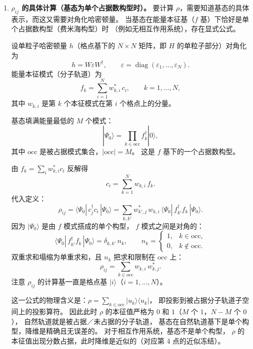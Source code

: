 \documentclass[11pt]{ctexart}
\begin{document}
\begin{enumerate}[leftmargin=2em, itemsep=0.8em]
在混合基下，例如
\[
u_1=\frac{v_1+v_2}{\sqrt2},\qquad u_2=\frac{v_1-v_2}{\sqrt2} ,
\]
则 $|\langle v_1|u_1\rangle|^2=|\langle v_2|u_1\rangle|^2=\tfrac12$，于是
\[
\langle u_1|\rho|u_1\rangle=\tfrac12\cdot 0.99+\tfrac12\cdot 0.01=0.5,
\qquad
\langle u_2|\rho|u_2\rangle=0.5 .
\]
两个占据数全变成了平庸的中间值，彻底抹平了 $0.99$ 与 $0.01$ 的极端性。

从瑞利商的角度看同样清楚：在所有归一化单粒子轨道 $|u\rangle$ 中，
$\langle u|\rho|u\rangle$ 的最大值是最大本征值 $\lambda_{\max}$，
且在 $|u\rangle$ 取对应本征矢时达到；最小值是 $\lambda_{\min}$，对应最小本征矢。
因此“逐条轨道取到最极端占据数”的唯一做法，就是取 $\rho$ 的完整本征基。
除非 $|u\rangle$ 与 $|v\rangle$ 是同一组基，即 $U$ 恰好是对角化 $\rho$ 的矩阵。

\item \textbf{$\rho_{ij}$ 的具体计算（基态为单个占据数构型时）。}
要计算 $\rho$，需要知道基态的具体表示，而这又需要对角化哈密顿量。
当基态在能量本征基（$f$ 基）下恰好是单个占据数构型（费米海构型）时
（例如无相互作用系统），存在显式公式。

设单粒子哈密顿量 $h$（格点基下的 $N\times N$ 矩阵，即 $H$ 的单粒子部分）对角化为
\[
h=W\varepsilon W^{\dagger},
\qquad
\varepsilon=\operatorname{diag}(\varepsilon_1,\dots,\varepsilon_N) .
\]
能量本征模式（分子轨道）为
\[
f_k=\sum_{i=1}^{N} w_{k,i}^{*}\,c_i ,
\qquad k=1,\dots,N ,
\]
其中 $w_{k,i}$ 是第 $k$ 个本征模式在第 $i$ 个格点上的分量。

基态填满能量最低的 $M$ 个模式：
\[
|\Psi_0\rangle=\prod_{k\in\mathrm{occ}} f_k^{\dagger}|0\rangle ,
\]
其中 $\mathrm{occ}$ 是被占据模式集合，$|\mathrm{occ}|=M$。
这是 $f$ 基下的一个占据数构型。

由 $f_k=\sum_i w_{k,i}^{*}c_i$ 反解得
\[
c_i=\sum_{k=1}^{N} w_{k,i}\,f_k .
\]
代入定义：
\[
\rho_{ij}
=\langle\Psi_0|\,c_j^{\dagger}c_i\,|\Psi_0\rangle
=\sum_{k,k'} w_{k',j}^{*}\,w_{k,i}\,
\langle\Psi_0|\,f_{k'}^{\dagger}f_k\,|\Psi_0\rangle .
\]
因为 $|\Psi_0\rangle$ 是由 $f$ 模式搭成的单个构型，
$f$ 模式之间是对角的：
\[
\langle\Psi_0|\,f_{k'}^{\dagger}f_k\,|\Psi_0\rangle
=\delta_{k,k'}\,n_k ,
\qquad
n_k=
\begin{cases}
1, & k\in\mathrm{occ},\\
0, & k\notin\mathrm{occ}.
\end{cases}
\]
双重求和塌缩为单重求和，且 $n_k$ 把求和限制在 $\mathrm{occ}$ 上：
\[
\rho_{ij}=\sum_{k\in\mathrm{occ}} w_{k,i}\,w_{k,j}^{*} .
\]
注意 $\rho_{ij}$ 的计算基一直是格点基 $|i\rangle$（$i=1,\dots,N$）。

这一公式的物理含义是：$\rho=\sum_{k\in\mathrm{occ}}|u_k\rangle\langle u_k|$，
即投影到被占据分子轨道子空间上的投影算符。
因此此时 $\rho$ 的本征值严格为 $0$ 和 $1$（$M$ 个 $1$，$N-M$ 个 $0$），
自然轨道就是被占据／未占据的分子轨道，
基态在自然轨道基下是单个构型，降维是精确且无误差的。
对于相互作用系统，基态不是单个构型，
$\rho$ 的本征值出现分数占据，此时降维是近似的（对应第 4 点的近似冻结）。


\end{enumerate}
\end{document}
